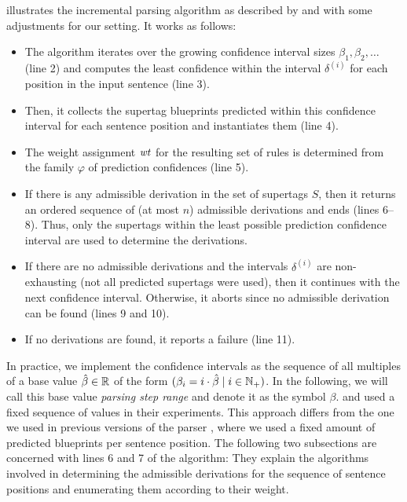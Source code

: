 \documentclass[../../document.tex]{subfiles}
\begin{document}
     illustrates the incremental parsing algorithm as described by \citet[Section~5.1]{Clark04} and \citet[Section~2.2.2]{Auli12} with some adjustments for our setting.
    It works as follows:
    \begin{itemize}
        \item The algorithm iterates over the growing confidence interval sizes \(\beta_1, \beta_2, \ldots\) (line 2) and computes the least confidence within the interval \(\delta^{(i)}\) for each position in the input sentence (line 3).
        \item Then, it collects the supertag blueprints predicted within this confidence interval for each sentence position and instantiates them (line 4).
        \item The weight assignment \(\mathit{wt}\) for the resulting set of rules is determined from the family \(\varphi\) of prediction confidences (line 5).
        \item If there is any admissible derivation in the set of supertags \(S\), then it returns an ordered sequence of (at most \(n\)) admissible derivations and ends (lines 6--8). Thus, only the supertags within the least possible prediction confidence interval are used to determine the derivations.
        \item If there are no admissible derivations and the intervals \(\delta^{(i)}\) are non-exhausting (not all predicted supertags were used), then it continues with the next confidence interval. Otherwise, it aborts since no admissible derivation can be found (lines 9 and 10).
        \item If no derivations are found, it reports a failure (line 11).
    \end{itemize}
    In practice, we implement the confidence intervals as the sequence of all multiples of a base value \(\hat{\beta}\in \mathbb{R}\) of the form \((\beta_i = i \cdot \hat{\beta} \mid i \in \mathbb{N}_+)\).
    In the following, we will call this base value \emph{parsing step range} and denote it as the symbol \(\beta\).
     and \citet{Auli12} used a fixed sequence of values in their experiments.
    This approach differs from the one we used in previous versions of the parser \citep{RupMoe21, Rup22}, where we used a fixed amount of predicted blueprints per sentence position.
    The following two subsections are concerned with lines 6 and 7 of the algorithm:
        They explain the algorithms involved in determining the admissible derivations for the sequence of sentence positions and enumerating them according to their weight.
\end{document}
